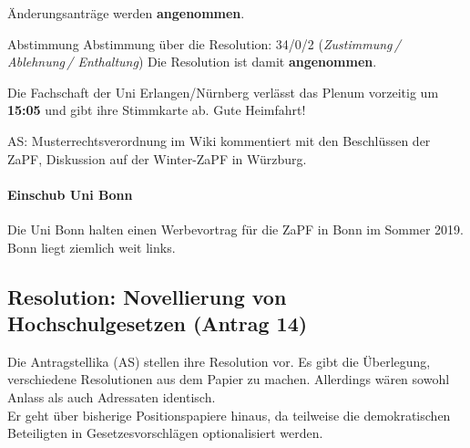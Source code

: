     Änderungsanträge werden \textbf{angenommen}.

    \begin{success}{Abstimmung}
      Abstimmung über die Resolution: 34/0/2 (\textit{Zustimmung\,/ Ablehnung\,/ Enthaltung})
      Die Resolution ist damit \textbf{angenommen}.
    \end{success}

    \begin{info}{}
      Die Fachschaft der Uni Erlangen/Nürnberg verlässt das Plenum vorzeitig um \textbf{15:05} und gibt ihre Stimmkarte ab. Gute Heimfahrt!
    \end{info}

    AS: Musterrechtsverordnung im Wiki kommentiert mit den Beschlüssen der ZaPF, Diskussion auf der Winter-ZaPF in Würzburg.

    \paragraph{Einschub Uni Bonn}
      Die Uni Bonn halten einen Werbevortrag für die ZaPF in Bonn im Sommer 2019. Bonn liegt ziemlich weit links.

  \subsection*{Resolution: Novellierung von Hochschulgesetzen (Antrag 14)}
    Die Antragstellika (AS) stellen ihre Resolution vor. Es gibt die Überlegung, verschiedene Resolutionen aus dem Papier zu machen. Allerdings wären sowohl Anlass als auch Adressaten identisch. \\
    Er geht über bisherige Positionspapiere hinaus, da teilweise die demokratischen Beteiligten in Gesetzesvorschlägen optionalisiert werden.

